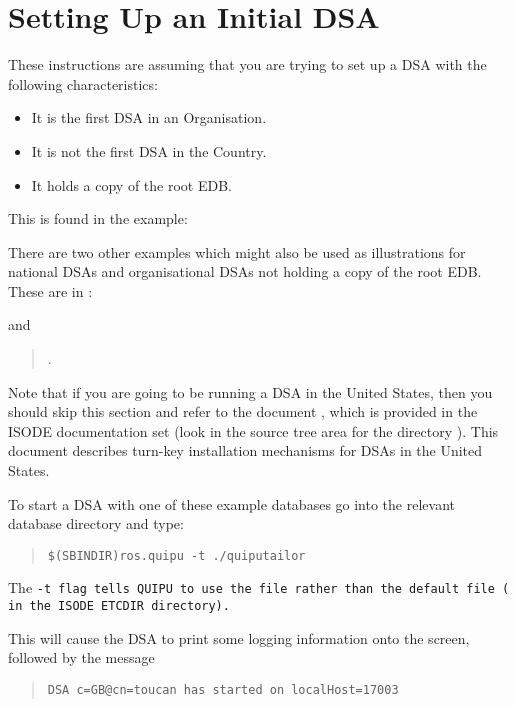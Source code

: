 \section {Setting Up an Initial DSA}

These instructions are assuming that you are trying to set up a DSA with the
following characteristics:
\begin{itemize}
\item It is the first DSA in an Organisation.
\item It is not the first DSA in the Country.
\item It holds a copy of the root EDB.
\end{itemize}

This is found in the example:
\begin{quote}
\end{quote}

There are two other examples which might also be used as illustrations for
national DSAs and organisational DSAs not holding a copy of the root EDB.
These are in :
\begin{quote}
\end{quote}
and
\begin{quote}
.
\end{quote}

Note that if you are going to be running a DSA in the United States,
then you should skip this section and refer to the document
\cite{PSI.Admin},
which is provided in the ISODE documentation set
(look in the source tree area for the directory ).
This document describes turn-key installation mechanisms for DSAs in the
United States.

To start a DSA with one of these example databases
go into the relevant database directory and type:
\begin{quote}\begin{verbatim}
$(SBINDIR)ros.quipu -t ./quiputailor
\end{verbatim}\end{quote}

The \tt -t\rm \ flag tells QUIPU to use the  file 
rather than the default file ( in the ISODE \verb"ETCDIR"
directory).

This will cause the DSA to print some logging information onto the screen,
followed by the message
\begin{quote}\begin{verbatim}
DSA c=GB@cn=toucan has started on localHost=17003
\end{verbatim}\end{quote}

